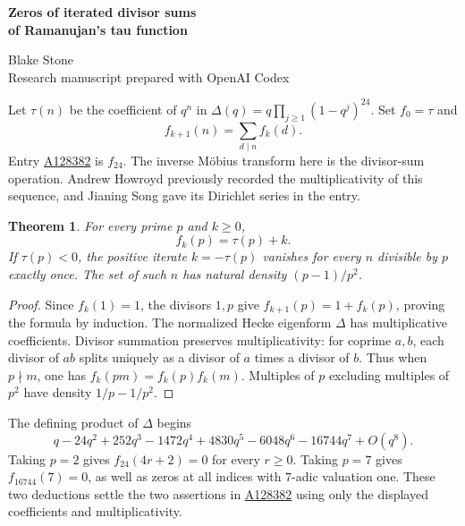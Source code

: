 \documentclass[11pt,letterpaper]{article}
\newtheorem{theorem}{Theorem}
\newcommand{\oeis}[1]{\href{https://oeis.org/A#1}{A#1}}
\begin{document}
\small
\thispagestyle{plain}
\begin{center}
{\LARGE\bfseries Zeros of iterated divisor sums\\[0.12em] of Ramanujan's tau function\par}
\vspace{0.5em}
Blake Stone\\
{\small Research manuscript prepared with OpenAI Codex}
\end{center}

\begin{abstract}
Gary W. Adamson asked whether the $24$th iterate of the divisor-sum operator on Ramanujan's $\tau$ is the only positive iterate with a zero, and whether this iterate has infinitely many zeros. The second answer is yes: it vanishes at every integer congruent to $2$ modulo $4$. The first answer is no: the $16744$th iterate vanishes at $7$. The Sato--Tate theorem supplies infinitely many distinct exceptional iteration counts, each with a positive-density set of zero indices.
\end{abstract}

Let $\tau(n)$ be the coefficient of $q^n$ in $\Delta(q)=q\prod_{j\ge1}(1-q^j)^{24}$. Set $f_0=\tau$ and
\[
                      f_{k+1}(n)=\sum_{d\mid n}f_k(d).
\]
Entry \oeis{128382} is $f_{24}$. The inverse M\"obius transform here is the divisor-sum operation. Andrew Howroyd previously recorded the multiplicativity of this sequence, and Jianing Song gave its Dirichlet series in the entry.

\begin{theorem}
For every prime $p$ and $k\ge0$,
\[
             f_k(p)=\tau(p)+k .
\]
If $\tau(p)<0$, the positive iterate $k=-\tau(p)$ vanishes for every $n$ divisible by $p$ exactly once. The set of such $n$ has natural density $(p-1)/p^2$.
\end{theorem}
\begin{proof}
Since $f_k(1)=1$, the divisors $1,p$ give $f_{k+1}(p)=1+f_k(p)$, proving the formula by induction. The normalized Hecke eigenform $\Delta$ has multiplicative coefficients. Divisor summation preserves multiplicativity: for coprime $a,b$, each divisor of $ab$ splits uniquely as a divisor of $a$ times a divisor of $b$. Thus when $p\nmid m$, one has $f_k(pm)=f_k(p)f_k(m)$. Multiples of $p$ excluding multiples of $p^2$ have density $1/p-1/p^2$.
\end{proof}

The defining product of $\Delta$ begins
\[
 q-24q^2+252q^3-1472q^4+4830q^5-6048q^6-16744q^7+O(q^8).
\]
Taking $p=2$ gives $f_{24}(4r+2)=0$ for every $r\ge0$. Taking $p=7$ gives $f_{16744}(7)=0$, as well as zeros at all indices with $7$-adic valuation one. These two deductions settle the two assertions in \oeis{128382} using only the displayed coefficients and multiplicativity.
\end{document}
